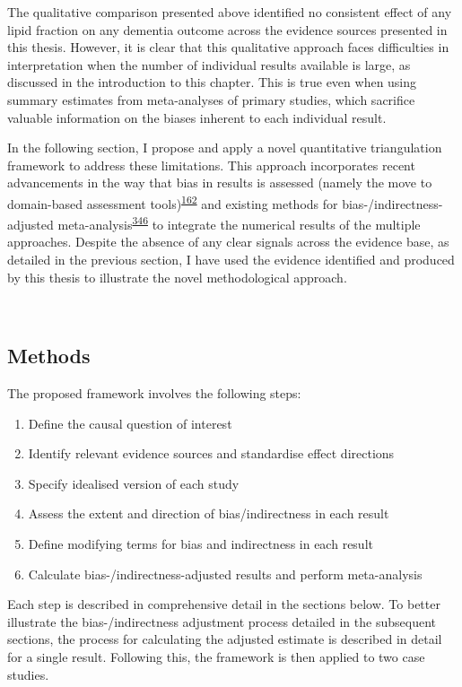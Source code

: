 \documentclass[a4paper, twoside]{templates/ociamthesis}
\providecommand{\tightlist}{%
  \setlength{\itemsep}{0pt}\setlength{\parskip}{0pt}}
\begin{document}
The qualitative comparison presented above identified no consistent effect of any lipid fraction on any dementia outcome across the evidence sources presented in this thesis. However, it is clear that this qualitative approach faces difficulties in interpretation when the number of individual results available is large, as discussed in the introduction to this chapter. This is true even when using summary estimates from meta-analyses of primary studies, which sacrifice valuable information on the biases inherent to each individual result.

In the following section, I propose and apply a novel quantitative triangulation framework to address these limitations. This approach incorporates recent advancements in the way that bias in results is assessed (namely the move to domain-based assessment tools)\textsuperscript{\protect\hyperlink{ref-sterne2019}{162}} and existing methods for bias-/indirectness-adjusted meta-analysis\textsuperscript{\protect\hyperlink{ref-turner2009}{346}} to integrate the numerical results of the multiple approaches. Despite the absence of any clear signals across the evidence base, as detailed in the previous section, I have used the evidence identified and produced by this thesis to illustrate the novel methodological approach.

~

\hypertarget{methods-3}{%
\subsection{Methods}\label{methods-3}}

The proposed framework involves the following steps:

\begin{enumerate}
\def\labelenumi{\arabic{enumi}.}
\tightlist
\item
  Define the causal question of interest
\item
  Identify relevant evidence sources and standardise effect directions
\item
  Specify idealised version of each study
\item
  Assess the extent and direction of bias/indirectness in each result
\item
  Define modifying terms for bias and indirectness in each result
\item
  Calculate bias-/indirectness-adjusted results and perform meta-analysis
\end{enumerate}

Each step is described in comprehensive detail in the sections below. To better illustrate the bias-/indirectness adjustment process detailed in the subsequent sections, the process for calculating the adjusted estimate is described in detail for a single result. Following this, the framework is then applied to two case studies.
\end{document}
